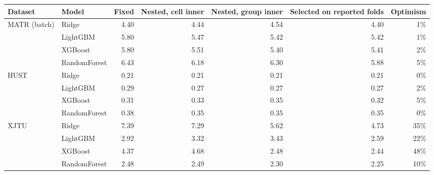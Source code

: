 \begin{tabular}{llrrrrr}
\toprule
Dataset & Model & Fixed & Nested, cell inner & Nested, group inner & Selected on reported folds & Optimism \\
\midrule
MATR (batch) & Ridge & 4.40 & 4.44 & 4.54 & 4.40 & 1\% \\
 & LightGBM & 5.80 & 5.47 & 5.42 & 5.42 & 1\% \\
 & XGBoost & 5.80 & 5.51 & 5.40 & 5.41 & 2\% \\
 & RandomForest & 6.43 & 6.18 & 6.30 & 5.88 & 5\% \\
HUST & Ridge & 0.21 & 0.21 & 0.21 & 0.21 & 0\% \\
 & LightGBM & 0.29 & 0.27 & 0.27 & 0.27 & 2\% \\
 & XGBoost & 0.31 & 0.33 & 0.35 & 0.32 & 5\% \\
 & RandomForest & 0.38 & 0.35 & 0.35 & 0.35 & 0\% \\
XJTU & Ridge & 7.39 & 7.29 & 5.62 & 4.73 & 35\% \\
 & LightGBM & 2.92 & 3.32 & 3.43 & 2.59 & 22\% \\
 & XGBoost & 4.37 & 4.68 & 2.48 & 2.44 & 48\% \\
 & RandomForest & 2.48 & 2.49 & 2.30 & 2.25 & 10\% \\
\bottomrule
\end{tabular}
